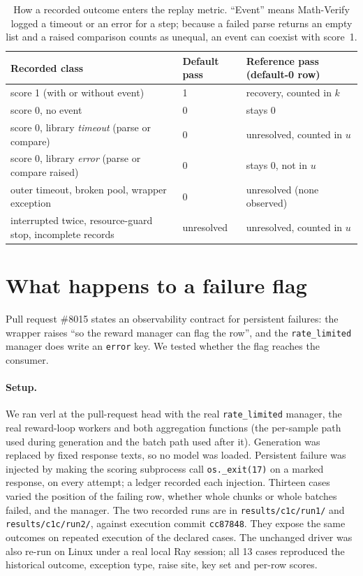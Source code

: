 \documentclass[10pt,a4paper]{article}
\newcommand{\mv}{Math-Verify}
\begin{document}
\begin{table}[h]
\centering
\caption{How a recorded outcome enters the replay metric. ``Event'' means
\mv{} logged a timeout or an error for a step; because a failed parse returns
an empty list and a raised comparison counts as unequal, an event can
coexist with score~1.}
\label{tab:classes}
\small
\begin{tabular}{@{}p{6.0cm}p{2.0cm}p{4.6cm}@{}}
\toprule
Recorded class & Default pass & Reference pass (default-0 row) \\
\midrule
score 1 (with or without event) & 1 & recovery, counted in $k$ \\
score 0, no event & 0 & stays 0 \\
score 0, library \emph{timeout} (parse or compare) & 0 & unresolved, counted in $u$ \\
score 0, library \emph{error} (parse or compare raised) & 0 & stays 0, not in $u$ \\
outer timeout, broken pool, wrapper exception & 0 & unresolved (none observed) \\
interrupted twice, resource-guard stop, incomplete records & unresolved & unresolved, counted in $u$ \\
\bottomrule
\end{tabular}
\end{table}

\section{What happens to a failure flag}
\label{sec:mechanism}

Pull request \#8015 states an observability contract for persistent
failures: the wrapper raises ``so the reward manager can flag the row'', and
the \texttt{rate\_limited} manager does write an \texttt{error} key. We tested
whether the flag reaches the consumer.

\paragraph{Setup.}
We ran verl at the pull-request head with the real \texttt{rate\_limited}
manager, the real reward-loop workers and both aggregation functions (the
per-sample path used during generation and the batch path used after it).
Generation was replaced by fixed response texts, so no model was loaded.
Persistent failure was injected by making the scoring subprocess call
\texttt{os.\_exit(17)} on a marked response, on every attempt; a ledger
recorded each injection. Thirteen cases varied the position of the failing
row, whether whole chunks or whole batches failed, and the manager.
The two recorded runs are in \texttt{results/c1c/run1/} and
\texttt{results/c1c/run2/}, against execution commit \texttt{cc87848}.
They expose the same outcomes on repeated execution of the declared cases.
The unchanged driver was also re-run on Linux under a
real local Ray session; all 13 cases reproduced the historical outcome,
exception type, raise site, key set and per-row scores.
\end{document}
